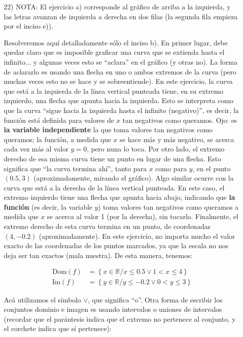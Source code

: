 \documentclass[12pt]{article}
\begin{document}
\begin{enumerate}
\begin{enumerate}
\end{enumerate}
\item[22)] NOTA: El ejercicio a) corresponde al gráfico de arriba a la izquierda, y las letras avanzan de izquierda a derecha en dos filas (la segunda fila empieza por el inciso e)).\par 
Resolveremos aquí detalladamente sólo el inciso b). En primer lugar, debe quedar claro que es imposible graficar una curva que se extienda hasta el infinito... y algunas veces esto se ``aclara'' en el gráfico (y otras no). La forma de aclararlo es usando una flecha en uno o ambos extremos de la curva (pero muchas veces esto no se hace y se sobreentiende). En este ejercicio, la curva que está a la izquierda de la línea vertical punteada tiene, en su extremo izquierdo, una flecha que apunta hacia la izquierda. Esto se interpreta como que la curva ``sigue hacia la izquierda hasta el infinito (negativo)'', es decir, la función está definida para valores de $x$ tan negativos como queramos. Ojo: es \textbf{la variable independiente} la que toma valores tan negativos como queramos; la función, a medida que $x$ se hace más y más negativo, se acerca cada vez más al valor $y = 0$, pero nuna lo toca. Por otro lado, el extremo derecho de esa misma curva tiene un punto en lugar de una flecha. Esto significa que ``la curva termina ahí'', tanto para $x$ como para $y$, en el punto $(0.5,3)$ (aproximadamente, mirando el gráfico). Algo similar ocurre con la curva que está a la derecha de la línea vertical punteada. En este caso, el extremo izquierdo tiene una flecha que apunta hacia abajo, indicando que \textbf{la función} (es decir, la variable $y$) toma valores tan negativos como queramos a medida que $x$ se acerca al valor 1 (por la derecha), sin tocarlo. Finalmente, el extremo derecho de esta curva termina en un punto, de coordenadas $(4,-0.2)$ (aproximadamente). En este ejercicio, no importa mucho el valor exacto de las coordenadas de los puntos marcados, ya que la escala no nos deja ser tan exactos (mala nuestra). De esta manera, tenemos:

\begin{align*}
\text{Dom}(f) &= \left\{x \in \mathbb{R} / x \leq 0.5 \lor 1 < x \leq 4\right\}\\
\text{Im}(f) &= \left\{y \in \mathbb{R} / y \leq -0.2 \lor 0 < y \leq 3\right\}
\end{align*}

Acá utilizamos el símbolo $\lor$, que significa ``o''. Otra forma de escribir los conjuntos dominio e imagen es usando intervalos o uniones de intervalos (recordar que el parántesis indica que el extremo no pertenece al conjunto, y el corchete indica que sí pertenece):


\end{enumerate}
\end{document}

